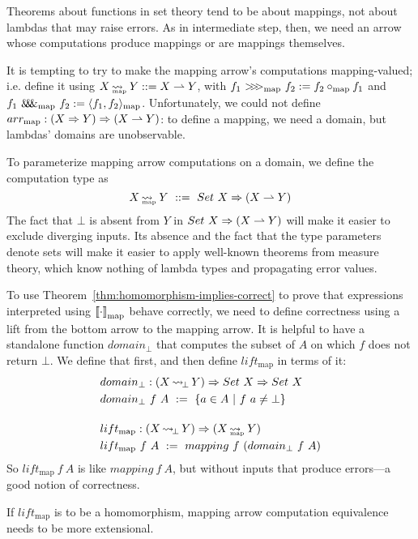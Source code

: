\documentclass[preprint]{sigplanconf}
\newcommand{\arrow}{\rightsquigarrow}
\newcommand{\pto}{\rightharpoonup}
\newcommand{\arrowlift}{\ensuremath{lift}}
\newcommand{\arrowarr}{\ensuremath{arr}}
\newcommand{\arrowcomp}{\ensuremath{{>}\mspace{-6mu}{>}\mspace{-6mu}{>}}}
\newcommand{\arrowpair}{\ensuremath{\mathit{\&\mspace{-7.5mu}\&\mspace{-7.5mu}\&}}}
\DeclareMathOperator{\botto}{\arrow_{\mspace{-3mu}\bot}}
\newcommand{\map}{_\mathrm{map}}
\DeclareMathOperator{\mapto}{\arrow_{\mspace{-21mu}\map}}
\newcommand{\liftmap}{\arrowlift\map}
\newcommand{\arrmap}{\arrowarr\map}
\newcommand{\compmap}{\arrowcomp\map}
\newcommand{\pairmap}{\arrowpair\map}
\begin{document}
Theorems about functions in set theory tend to be about mappings, not about lambdas that may raise errors.
As in intermediate step, then, we need an arrow whose computations produce mappings or are mappings themselves.

It is tempting to try to make the mapping arrow's computations mapping-valued; i.e. define it using $X \mapto Y ::= X \pto Y$, with $f_1~\compmap~f_2 := f_2 \circ\map f_1$ and $f_1~\pairmap~f_2 := \pair{f_1,f_2}\map$.
Unfortunately, we could not define $\arrmap : (X \tto Y) \tto (X \pto Y)$: to define a mapping, we need a domain, but lambdas' domains are unobservable.

To parameterize mapping arrow computations on a domain, we define the  computation type as
\begin{equation}
	X \mapto Y \ ::= \ Set~X \tto (X \pto Y)
\end{equation}
The fact that $\bot$ is absent from $Y$ in $Set~X \tto (X \pto Y)$ will make it easier to exclude diverging inputs.
Its absence and the fact that the type parameters denote sets will make it easier to apply well-known theorems from measure theory, which know nothing of lambda types and propagating error values.

To use Theorem~\ref{thm:homomorphism-implies-correct} to prove that expressions interpreted using $\meaningof{\cdot}\map$ behave correctly, we need to define correctness using a lift from the bottom arrow to the mapping arrow.
It is helpful to have a standalone function $domain_\bot$ that computes the subset of $A$ on which $f$ does not return $\bot$.
We define that first, and then define $\liftmap$ in terms of it:
\begin{align}
	&\begin{aligned}
		&domain_\bot : (X \botto Y) \tto Set~X \tto Set~X \\
		&domain_\bot~f~A \ := \ \setb{a \in A}{f~a \neq \bot}
	\end{aligned} \\
\nonumber \\[-6pt]
	&\begin{aligned}
		&\liftmap : (X \botto Y) \tto (X \mapto Y) \\
		&\liftmap~f~A \ := \ mapping~f~(domain_\bot~f~A)
	\end{aligned}
\end{align}
So $\liftmap~f~A$ is like $mapping~f~A$, but without inputs that produce errors---a good notion of correctness.

If $\liftmap$ is to be a homomorphism, mapping arrow computation equivalence needs to be more extensional.
\end{document}
